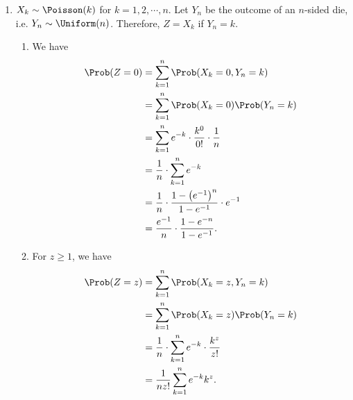 \begin{enumerate}
    \item \(X_k \sim \Poisson(k)\) for \(k = 1, 2, \cdots, n\). Let \(Y_n\) be the outcome of an \(n\)-sided die, i.e. \(Y_n \sim \Uniform(n)\). Therefore, \(Z = X_k\) if \(Y_n = k\).

          \begin{enumerate}
              \item We have
                    \begin{align*}
                        \Prob(Z = 0) & = \sum_{k = 1}^{n} \Prob(X_k = 0, Y_n = k)                                    \\
                                     & = \sum_{k = 1}^{n} \Prob(X_k = 0) \Prob(Y_n = k)                              \\
                                     & = \sum_{k = 1}^{n} e^{-k} \cdot \frac{k^0}{0!} \cdot \frac{1}{n}              \\
                                     & = \frac{1}{n} \cdot \sum_{k = 1}^{n} e^{-k}                                   \\
                                     & = \frac{1}{n} \cdot \frac{1 - \left(e^{-1}\right)^n}{1 - e^{-1}} \cdot e^{-1} \\
                                     & = \frac{e^{-1}}{n} \cdot \frac{1 - e^{-n}}{1 - e^{-1}}.
                    \end{align*}

              \item For \(z \geq 1\), we have
                    \begin{align*}
                        \Prob(Z = z) & = \sum_{k = 1}^{n} \Prob(X_k = z, Y_n = k)                       \\
                                     & = \sum_{k = 1}^{n} \Prob(X_k = z) \Prob(Y_n = k)                 \\
                                     & = \frac{1}{n} \cdot \sum_{k = 1}^{n} e^{-k} \cdot \frac{k^z}{z!} \\
                                     & = \frac{1}{nz!} \sum_{k = 1}^{n} e^{-k} k^{z}.
                    \end{align*}


\end{enumerate}
\end{enumerate}
